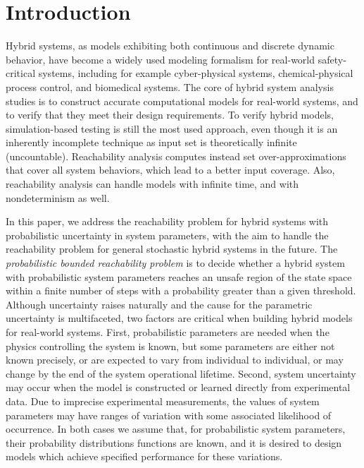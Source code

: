 \section{Introduction}  
Hybrid systems, as models exhibiting both continuous and discrete dynamic behavior, have become 
a widely used modeling formalism for real-world safety-critical systems,
including for example cyber-physical systems, chemical-physical process control, and biomedical systems. 
The core of hybrid system analysis studies is to construct accurate computational models for real-world systems, 
and to verify that they meet their design requirements. To verify hybrid models, simulation-based testing 
is still the most used approach, even though it is an inherently incomplete technique as input set 
is theoretically infinite (uncountable). Reachability analysis computes instead set over-approximations that
cover all system behaviors, which lead to a better input coverage.
Also, reachability analysis can handle models with infinite time, and with nondeterminism as well. 

In this paper, we address the reachability problem for hybrid systems with probabilistic uncertainty in 
system parameters, with the aim to handle the reachability problem for general stochastic hybrid systems in
the future.
The {\em probabilistic bounded reachability problem} is to decide whether
a hybrid system with probabilistic system parameters reaches an unsafe region of the
state space within a finite number of steps with a probability greater than a given threshold.
Although uncertainty raises naturally and the cause for the parametric uncertainty is multifaceted, two factors 
are critical when building hybrid models for real-world systems. 
First, probabilistic parameters are needed when the physics controlling the system is known, but some 
parameters are either not known precisely, or are expected to vary from individual to individual, 
or may change by the end of the system operational lifetime. 
Second, system uncertainty may occur when the model is constructed or learned directly from experimental data. 
Due to imprecise experimental measurements, the values of system parameters may have ranges of variation 
with some associated likelihood of occurrence. 
In both cases we assume that, for probabilistic system parameters, their probability distributions functions 
are known, and it is desired to design models which achieve specified performance for these variations.   

